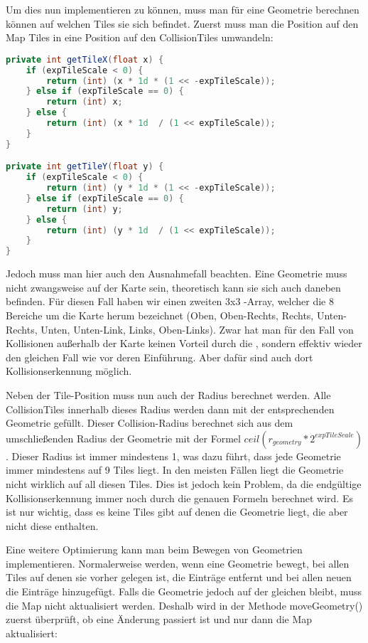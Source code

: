 Um dies nun implementieren zu können, muss man für eine Geometrie berechnen können auf welchen Tiles sie sich befindet.
Zuerst muss man die Position auf den Map Tiles in eine Position auf den CollisionTiles umwandeln:

\doinline
\begin{lstlisting}[caption=Berechnen der CollisionMap-Position aus der Tile-Position, title=\hspace{0 pt}, language=java]
private int getTileX(float x) {
	if (expTileScale < 0) {
		return (int) (x * 1d * (1 << -expTileScale));		
	} else if (expTileScale == 0) {
		return (int) x;
	} else {
		return (int) (x * 1d  / (1 << expTileScale));
	}
}

private int getTileY(float y) {
	if (expTileScale < 0) {
		return (int) (y * 1d * (1 << -expTileScale));		
	} else if (expTileScale == 0) {
		return (int) y;
	} else {
		return (int) (y * 1d  / (1 << expTileScale));
	}
}
\end{lstlisting}

Jedoch muss man hier auch den Ausnahmefall beachten. Eine Geometrie muss nicht zwangsweise auf der Karte sein, theoretisch kann sie sich auch daneben befinden.
Für diesen Fall haben wir einen zweiten 3x3 -Array, welcher die 8 Bereiche um die Karte herum bezeichnet (Oben, Oben-Rechts, Rechts, Unten-Rechts, Unten, Unten-Link, Links, Oben-Links). Zwar hat man für den Fall von Kollisionen außerhalb der Karte keinen Vorteil durch die , sondern effektiv wieder den gleichen Fall wie vor deren Einführung. Aber dafür sind auch dort Kollisionserkennung möglich.

Neben der Tile-Position muss nun auch der Radius berechnet werden. Alle CollisionTiles innerhalb dieses Radius werden dann mit der entsprechenden Geometrie gefüllt. Dieser Collision-Radius berechnet sich aus dem umschließenden Radius der Geometrie mit der Formel $ceil(r_{geometry} * 2^{expTileScale})$.
Dieser Radius ist immer mindestens 1, was dazu führt, dass jede Geometrie immer mindestens auf 9 Tiles liegt. In den meisten Fällen liegt die Geometrie nicht wirklich auf all diesen Tiles. Dies ist jedoch kein Problem, da die endgültige Kollisionserkennung immer noch durch die genauen Formeln berechnet wird.
Es ist nur wichtig, dass es keine Tiles gibt auf denen die Geometrie liegt, die aber nicht diese enthalten.

Eine weitere Optimierung kann man beim Bewegen von Geometrien implementieren. Normalerweise werden, wenn eine Geometrie bewegt, bei allen Tiles auf denen sie vorher gelegen ist, die Einträge entfernt und bei allen neuen die Einträge hinzugefügt. Falls die Geometrie jedoch auf der gleichen  bleibt, muss die Map nicht aktualisiert werden. Deshalb wird in der Methode moveGeometry() zuerst überprüft, ob eine Änderung passiert ist und nur dann die Map aktualisiert:

